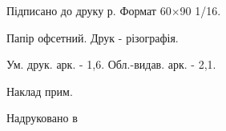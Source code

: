 \documentclass[a5paper,10pt,twoside,openany,article]{memoir} %
\begin{document}
\mainmatter*                  %

\newpage\thispagestyle{empty}

\vspace*{0pt plus1fill}

\small
\begin{center}
%    
%    
    
    Підписано до друку  р. Формат 60\(\times\)90 1/16.
    
    Папір офсетний. Друк - різографія.
    
    Ум. друк. арк. - 1,6. Обл.-видав. арк. - 2,1.
    
    Наклад  прим.
    
    Надруковано в \todo{\blank[0.5\linewidth]}
\end{center}
\cleardoublepage
\end{document}
